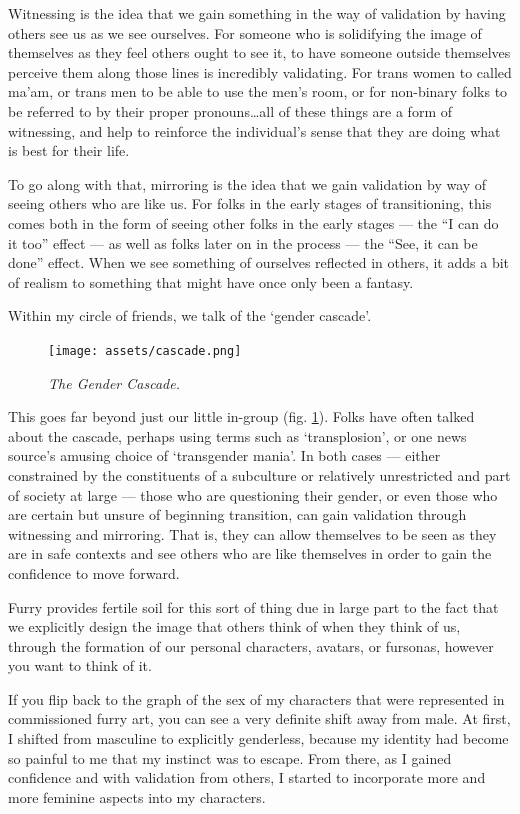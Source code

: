 Witnessing is the idea that we gain something in the way of validation by having others see us as we see ourselves.  For someone who is solidifying the image of themselves as they feel others ought to see it, to have someone outside themselves perceive them along those lines is incredibly validating.  For trans women to called ma'am, or trans men to be able to use the men's room, or for non-binary folks to be referred to by their proper pronouns\ldots{}all of these things are a form of witnessing, and help to reinforce the individual's sense that they are doing what is best for their life.

To go along with that, mirroring is the idea that we gain validation by way of seeing others who are like us.  For folks in the early stages of transitioning, this comes both in the form of seeing other folks in the early stages --- the ``I can do it too'' effect --- as well as folks later on in the process --- the ``See, it can be done'' effect.  When we see something of ourselves reflected in others, it adds a bit of realism to something that might have once only been a fantasy.

Within my circle of friends, we talk of the `gender cascade'.

\begin{figure}
  \centering
  \texttt{[image: assets/cascade.png]}
  \caption{\textit{The Gender Cascade.}}
  \label{fig:cascade}
\end{figure}

This goes far beyond just our little in-group (fig. \ref{fig:cascade}).  Folks have often talked about the cascade, perhaps using terms such as `transplosion', or one news source's amusing choice of `transgender mania'.  In both cases --- either constrained by the constituents of a subculture or relatively unrestricted and part of society at large --- those who are questioning their gender, or even those who are certain but unsure of beginning transition, can gain validation through witnessing and mirroring.  That is, they can allow themselves to be seen as they are in safe contexts and see others who are like themselves in order to gain the confidence to move forward.

Furry provides fertile soil for this sort of thing due in large part to the fact that we explicitly design the image that others think of when they think of us, through the formation of our personal characters, avatars, or fursonas, however you want to think of it.

If you flip back to the graph of the sex of my characters that were represented in commissioned furry art, you can see a very definite shift away from male.  At first, I shifted from masculine to explicitly genderless, because my identity had become so painful to me that my instinct was to escape.  From there, as I gained confidence and with validation from others, I started to incorporate more and more feminine aspects into my characters.

